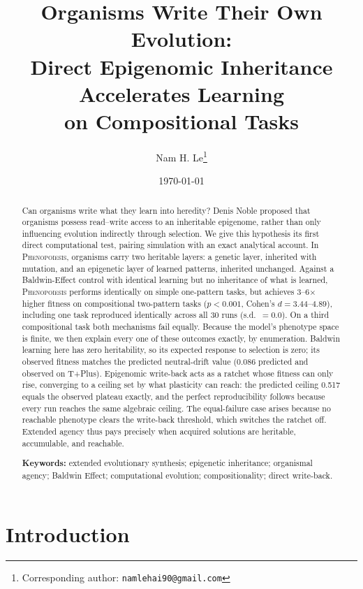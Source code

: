 \documentclass[11pt]{article}
\title{\bfseries Organisms Write Their Own Evolution:\\
Direct Epigenomic Inheritance Accelerates Learning\\ on Compositional Tasks}
\author{Nam H. Le\thanks{Corresponding author: \texttt{namlehai90@gmail.com}}}
\affil{Vermont Complexity Center, University of Vermont, Burlington, VT, USA}
\date{\today}
\newcommand{\Pheno}{\textsc{Phenopoiesis}}
\begin{document}
\maketitle

\begin{abstract}
\noindent
Can organisms write what they learn into heredity? Denis Noble proposed that
organisms possess read--write access to an inheritable epigenome, rather than
only influencing evolution indirectly through selection. We give this
hypothesis its first direct computational test, pairing simulation with an
exact analytical account. In \Pheno{}, organisms carry two heritable layers:
a genetic layer, inherited with mutation, and an epigenetic layer of learned
patterns, inherited unchanged. Against a Baldwin-Effect control with
identical learning but no inheritance of what is learned, \Pheno{} performs
identically on simple one-pattern tasks, but achieves 3--6$\times$ higher
fitness on compositional two-pattern tasks ($p < 0.001$, Cohen's $d =
3.44$--$4.89$), including one task reproduced identically across all 30 runs
(s.d.\ $= 0.0$). On a third compositional task both mechanisms fail equally.
Because the model's phenotype space is finite, we then explain every one of
these outcomes exactly, by enumeration. Baldwin learning here has zero
heritability, so its expected response to selection is zero; its observed
fitness matches the predicted neutral-drift value (0.086 predicted and
observed on T+Plus). Epigenomic write-back acts as a ratchet whose fitness
can only rise, converging to a ceiling set by what plasticity can reach: the
predicted ceiling 0.517 equals the observed plateau exactly, and the
perfect reproducibility follows because every run reaches the same algebraic
ceiling. The equal-failure case arises because no reachable phenotype clears
the write-back threshold, which switches the ratchet off. Extended agency
thus pays precisely when acquired solutions are heritable, accumulable, and
reachable.

\vspace{0.8em}
\noindent\textbf{Keywords:} extended evolutionary synthesis; epigenetic inheritance;
organismal agency; Baldwin Effect; computational evolution; compositionality;
direct write-back.
\end{abstract}

\section{Introduction}
\end{document}
